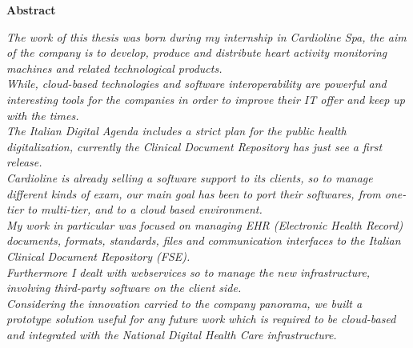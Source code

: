 \thispagestyle{empty}

\begin{center}
  {\bf \Huge Abstract}
\end{center}

\vspace{4cm}


\emph{
  The work of this thesis was born during my internship in Cardioline Spa, the aim of the company is to develop, produce and distribute heart activity monitoring machines and related technological products.\\While, cloud-based technologies and software interoperability are powerful and interesting tools for the companies in order to improve their IT offer and keep up with the times.\\The Italian Digital Agenda includes a strict plan for the public health digitalization, currently the Clinical Document Repository has just see a first release.\\Cardioline is already selling a software support to its clients, so to manage different kinds of exam, our main goal has been to port their softwares, from one-tier to multi-tier, and to a cloud based environment.\\My work in particular was focused on managing EHR (Electronic Health Record) documents, formats, standards, files and communication interfaces to the Italian Clinical Document Repository (FSE).\\Furthermore I dealt with webservices so to manage the new infrastructure, involving third-party software on the client side.\\Considering the innovation carried to the company panorama, we built a prototype solution useful for any future work which is required to be cloud-based and integrated with the National Digital Health Care infrastructure.
}
